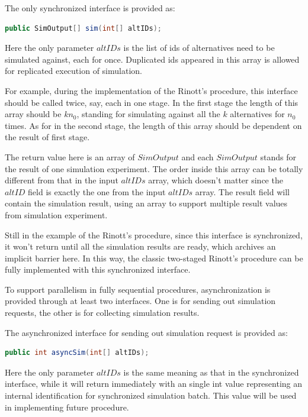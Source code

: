 The only synchronized interface is provided as:

\begin{lstlisting}[language=Java]
public SimOutput[] sim(int[] altIDs);
\end{lstlisting}

Here the only parameter $altIDs$ is the list of ids of alternatives need to be simulated against, each for once. Duplicated ids appeared in this array is allowed for replicated execution of simulation.

For example, during the implementation of the Rinott's procedure, this interface should be called twice, say, each in one stage. In the first stage the length of this array should be $kn_0$, standing for simulating against all the $k$ alternatives for $n_0$ times. As for in the second stage, the length of this array should be dependent on the result of first stage.

The return value here is an array of $SimOutput$ and each $SimOutput$ stands for the result of one simulation experiment. The order inside this array can be totally different from that in the input $altIDs$ array, which doesn't matter since the $altID$ field is exactly the one from the input $altIDs$ array. The result field will contain the simulation result, using an array to support multiple result values from simulation experiment.

Still in the example of the Rinott's procedure, since this interface is synchronized, it won't return until all the simulation results are ready, which archives an implicit barrier here. In this way, the classic two-staged Rinott's procedure can be fully implemented with this synchronized interface.

To support parallelism in fully sequential procedures, asynchronization is provided through at least two interfaces. One is for sending out simulation requests, the other is for collecting simulation results.

The asynchronized interface for sending out simulation request is provided as:

\begin{lstlisting}[language=Java]
public int asyncSim(int[] altIDs);
\end{lstlisting}

Here the only parameter $altIDs$ is the same meaning as that in the synchronized interface, while it will return immediately with an single int value representing an internal identification for synchronized simulation batch. This value will be used in implementing future procedure.

